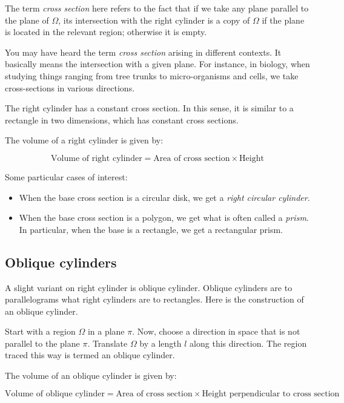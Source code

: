 \documentclass[10pt]{amsart}
\begin{document}
The term {\em cross section} here refers to the fact that if we take
any plane parallel to the plane of $\Omega$, its intersection with the
right cylinder is a copy of $\Omega$ if the plane is located in the
relevant region; otherwise it is empty. 

You may have heard the term {\em cross section} arising in different
contexts. It basically means the intersection with a given plane. For
instance, in biology, when studying things ranging from tree trunks to
micro-organisms and cells, we take cross-sections in various
directions.

The right cylinder has a constant cross section. In this sense, it is
similar to a rectangle in two dimensions, which has constant cross
sections.

The volume of a right cylinder is given by:

\begin{equation*}
  \text{Volume of right cylinder} = \text{Area of cross section} \times \text{Height}
\end{equation*}

Some particular cases of interest:

\begin{itemize}
\item When the base cross section is a circular disk, we get a {\em
  right circular cylinder}.
\item When the base cross section is a polygon, we get what is often
  called a {\em prism}. In particular, when the base is a rectangle,
  we get a rectangular prism.
\end{itemize}

\subsection{Oblique cylinders}

A slight variant on right cylinder is oblique cylinder. Oblique
cylinders are to parallelograms what right cylinders are to
rectangles. Here is the construction of an oblique cylinder.

Start with a region $\Omega$ in a plane $\pi$. Now, choose a direction
in space that is not parallel to the plane $\pi$. Translate $\Omega$
by a length $l$ along this direction. The region traced this way is
termed an oblique cylinder.

The volume of an oblique cylinder is given by:

\begin{equation*}
  \text{Volume of oblique cylinder} = \text{Area of cross section} \times \text{Height perpendicular to cross section}
\end{equation*}
\end{document}
